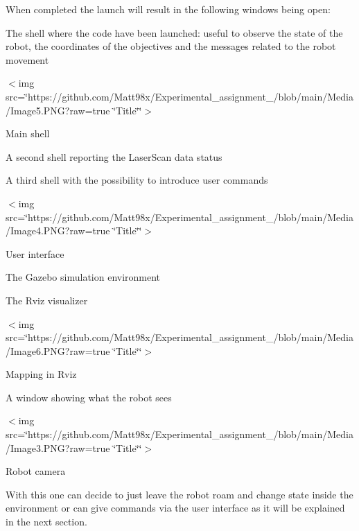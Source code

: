 When completed the launch will result in the following windows being open\+:
\begin{DoxyItemize}
\item The shell where the code have been launched\+: useful to observe the state of the robot, the coordinates of the objectives and the messages related to the robot movement 
\end{DoxyItemize}

$<$img src=\char`\"{}https\+://github.\+com/\+Matt98x/\+Experimental\+\_\+assignment\+\_/blob/main/\+Media/\+Image5.\+P\+N\+G?raw=true \char`\"{}Title\char`\"{}\char`\"{}$>$ 

Main shell 


\begin{DoxyItemize}
\item A second shell reporting the Laser\+Scan data status
\item A third shell with the possibility to introduce user commands 
\end{DoxyItemize}

$<$img src=\char`\"{}https\+://github.\+com/\+Matt98x/\+Experimental\+\_\+assignment\+\_/blob/main/\+Media/\+Image4.\+P\+N\+G?raw=true \char`\"{}Title\char`\"{}\char`\"{}$>$ 

User interface 


\begin{DoxyItemize}
\item The Gazebo simulation environment
\item The Rviz visualizer 
\end{DoxyItemize}

$<$img src=\char`\"{}https\+://github.\+com/\+Matt98x/\+Experimental\+\_\+assignment\+\_/blob/main/\+Media/\+Image6.\+P\+N\+G?raw=true \char`\"{}Title\char`\"{}\char`\"{}$>$ 

Mapping in Rviz 


\begin{DoxyItemize}
\item A window showing what the robot sees 
\end{DoxyItemize}

$<$img src=\char`\"{}https\+://github.\+com/\+Matt98x/\+Experimental\+\_\+assignment\+\_/blob/main/\+Media/\+Image3.\+P\+N\+G?raw=true \char`\"{}Title\char`\"{}\char`\"{}$>$ 

Robot camera 

With this one can decide to just leave the robot roam and change state inside the environment or can give commands via the user interface as it will be explained in the next section.

